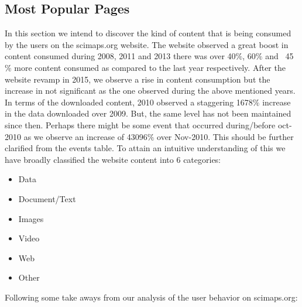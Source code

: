\subsection{Most Popular Pages} \label{viztoppages}
In this section we intend to discover the kind of content that is being consumed by the users on the scimaps.org website. 
The website observed a great boost in content consumed during 2008, 2011 and 2013 there was over 40$\%$, 60$\%$ and ~45$\%$ more content consumed as compared to the last year respectively. After the website revamp in 2015, we observe a rise in content consumption but the increase in not significant as the one observed during the above mentioned years. 
In terms of the downloaded content, 2010 observed a staggering 1678$\%$ increase in the data downloaded over 2009. But, the same level has not been maintained since then. Perhaps there might be some event that occurred during/before oct-2010 as we observe an increase of 43096$\%$ over Nov-2010. This should be further clarified from the events table.
To attain an intuitive understanding of this we have broadly classified the website content into 6 categories:
\begin{itemize}
\item Data
\item Document/Text
\item Images
\item Video
\item Web
\item Other
\end{itemize}
Following some take aways from our analysis of the user behavior on scimaps.org: 
